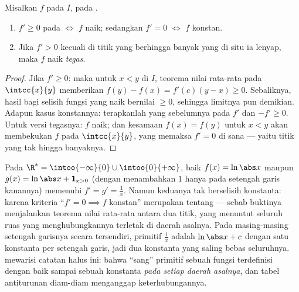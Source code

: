 \begin{corollary}\label{cor:b1:derivative:monotone}
Misalkan $f$  pada $I$,  pada .
\begin{enumerate}
  \item $f' \geq 0$ pada  $\iff$ $f$ naik; sedangkan $f' = 0$
        $\iff$ $f$ konstan.
  \item Jika $f' > 0$ kecuali di titik yang berhingga banyak yang di situ ia lenyap, maka
        $f$ naik \emph{tegas}.
\end{enumerate}
\end{corollary}

\begin{proof}
Jika $f' \geq 0$: maka untuk $x < y$ di $I$, teorema nilai rata-rata pada
$\intcc{x}{y}$ memberikan $f(y) - f(x) = f'(c)(y - x) \geq 0$. Sebaliknya,
hasil bagi selisih fungsi yang naik bernilai $\geq 0$, sehingga
limitnya pun demikian. Adapun kasus konstannya: terapkanlah yang sebelumnya pada $f'$ dan
$-f' \geq 0$. Untuk versi tegasnya: $f$ naik; dan kesamaan $f(x) =
f(y)$ untuk $x < y$ akan membekukan $f$ pada $\intcc{x}{y}$, yang memaksa $f' =
0$ di sana --- yaitu titik yang tak hingga banyaknya.
\end{proof}

\begin{example}\label{ex:b1:derivative:intervalmatters}
Pada $\R^* = \intoo{-\infty}{0} \cup \intoo{0}{+\infty}$, baik
$f(x) = \ln\abs x$ maupun $g(x) = \ln\abs x + \mathbf{1}_{x>0}$
(dengan menambahkan $1$ hanya pada setengah garis kanannya) memenuhi $f' = g' =
\frac1x$. Namun keduanya tak berselisih konstanta: karena kriteria
``$f' = 0 \implies f$ konstan'' merupakan  tentang \emph{}
--- sebab buktinya menjalankan teorema nilai rata-rata antara dua titik,
yang menuntut seluruh ruas yang menghubungkannya terletak di
daerah asalnya. Pada masing-masing setengah garisnya secara tersendiri, primitif
$\frac1x$ adalah $\ln\abs x + c$ dengan satu konstanta per setengah garis,
jadi dua konstanta yang saling bebas seluruhnya. 
mewarisi catatan halus ini: bahwa ``sang'' primitif sebuah fungsi
terdefinisi dengan baik sampai sebuah konstanta \emph{pada setiap  daerah
asalnya}, dan tabel antiturunan diam-diam menganggap keterhubungannya.
\end{example}

